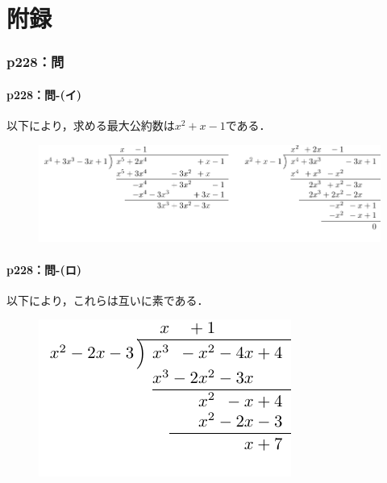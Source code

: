 \part*{附録\three}


\section*{p228：問}

\subsection*{p228：問-(イ)}
以下により，求める最大公約数は$x^2+x-1$である．

\begin{figure}[ht]
  \centering
  \includegraphics{emath_figures/p228_toi_i.pdf}
\end{figure}


\subsection*{p228：問-(ロ)}

以下により，これらは互いに素である．

\begin{figure}[ht]
  \centering
  \includegraphics{emath_figures/p228_toi_ro.pdf}
\end{figure}



